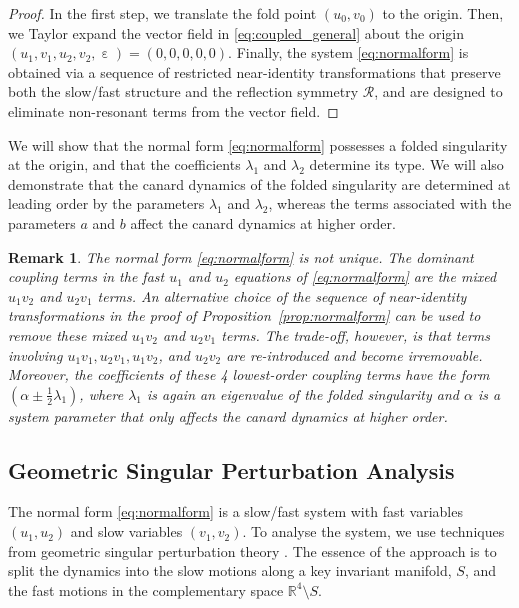 \documentclass[10pt,onecolumn]{article}
\theoremstyle{plain}
\newtheorem{remark}{Remark}[section]
\DeclareMathOperator{\eps}{\varepsilon}
\begin{document}
\begin{proof}
In the first step, we translate the fold point $(u_0,v_0)$ to the origin. 
Then, we Taylor expand the vector field in \eqref{eq:coupled_general} about the origin $(u_1,v_1,u_2,v_2,\eps)=(0,0,0,0,0)$.
Finally, the system \eqref{eq:normalform} is obtained via a sequence of restricted near-identity transformations that preserve both the slow/fast structure and the reflection symmetry $\mathcal R$, and are designed to eliminate non-resonant terms from the vector field. 
\end{proof}

We will show that the normal form \eqref{eq:normalform} possesses a folded singularity \cite{Szmolyan2001} at the origin, and that the coefficients $\lambda_1$ and $\lambda_2$ determine its type.
We will also demonstrate that the canard dynamics of the folded singularity are determined at leading order by the parameters $\lambda_1$ and $\lambda_2$, whereas the terms associated with the parameters $a$ and $b$ affect the canard dynamics at higher order. 

\medskip
\begin{remark}
The normal form \eqref{eq:normalform} is not unique. The dominant coupling terms in the fast $u_1$ and $u_2$ equations of \eqref{eq:normalform} are the mixed $u_1 v_2$ and $u_2 v_1$ terms. An alternative choice of the sequence of near-identity transformations in the proof of Proposition~\ref{prop:normalform} can be used to remove these mixed $u_1 v_2$ and $u_2 v_1$ terms. The trade-off, however, is that terms involving $u_1 v_1, u_2 v_1, u_1 v_2$, and $u_2 v_2$ are re-introduced and become irremovable.  Moreover, the coefficients of these 4 lowest-order coupling terms have the form $(\alpha \pm \tfrac{1}{2}\lambda_1)$, where $\lambda_1$ is again an eigenvalue of the folded singularity and $\alpha$ is a system parameter that only affects the canard dynamics at higher order. 
\end{remark}


\subsection{Geometric Singular Perturbation Analysis} \label{subsec:normalformGSPT}
The normal form \eqref{eq:normalform} is a slow/fast system with fast variables $(u_1,u_2)$ and slow variables $(v_1,v_2)$. To analyse the system, we use techniques from geometric singular perturbation theory \cite{Fenichel1979,Jones1995}. The essence of the approach is to split the dynamics into the slow motions along a key invariant manifold, $S$, and the fast motions in the complementary space $\mathbb R^4 \setminus S$.
\end{document}
